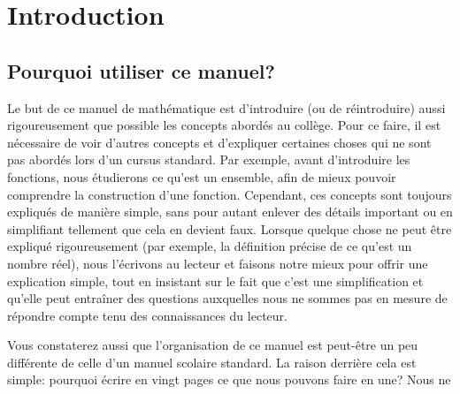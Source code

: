 \chapter*{Introduction}

\section{Pourquoi utiliser ce manuel?}

Le but de ce manuel de mathématique est d'introduire (ou de réintroduire) aussi rigoureusement que possible les concepts abordés au collège. Pour ce faire, il est nécessaire de voir d'autres concepts et d'expliquer certaines choses qui ne sont pas abordés lors d'un cursus standard. Par exemple, avant d'introduire les fonctions, nous étudierons ce qu'est un ensemble, afin de mieux pouvoir comprendre la construction d'une fonction. Cependant, ces concepts sont toujours expliqués de manière simple, sans pour autant enlever des détails important ou en simplifiant tellement que cela en devient faux. Lorsque quelque chose ne peut être expliqué rigoureusement (par exemple, la définition précise de ce qu'est un nombre réel), nous l'écrivons au lecteur et faisons notre mieux pour offrir une explication simple, tout en insistant sur le fait que c'est une simplification et qu'elle peut entraîner des questions auxquelles nous ne sommes pas en mesure de répondre compte tenu des connaissances du lecteur.

Vous constaterez aussi que l'organisation de ce manuel est peut-être un peu différente de celle d'un manuel scolaire standard. La raison derrière cela est simple: pourquoi écrire en vingt pages ce que nous pouvons faire en une? Nous ne